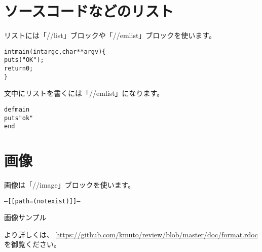 \section{ソースコードなどのリスト}

リストには「//list」ブロックや「//emlist」ブロックを使います。

\begin{reviewlist}
\begin{alltt}
int main(int argc, char **argv) \{
  puts("OK");
  return 0;
\}
\end{alltt}
\end{reviewlist}


文中にリストを書くには「//emlist」になります。

\begin{reviewemlist}
\begin{alltt}
def main
  puts "ok"
end
\end{alltt}
\end{reviewemlist}

\section{画像}

画像は「//image」ブロックを使います。

\begin{reviewdummyimage}
\begin{alltt}
--[[path =  (not exist)]]--
\end{alltt}
\label{image:ch01:imgsample}
画像サンプル
\end{reviewdummyimage}

より詳しくは、
\url{https://github.com/kmuto/review/blob/master/doc/format.rdoc}
を御覧ください。
